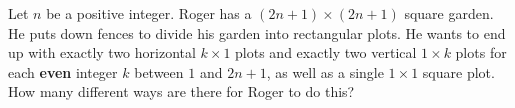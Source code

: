 Let $n$ be a positive integer.
Roger has a $(2n+1) \times (2n+1)$ square garden.
He puts down fences to divide his garden into rectangular plots.
He wants to end up with exactly two horizontal $k \times 1$ plots and
exactly two vertical $1 \times k$ plots for each \textbf{even} integer $k$ between $1$ and $2n+1$,
as well as a single $1 \times 1$ square plot.
How many different ways are there for Roger to do this?
